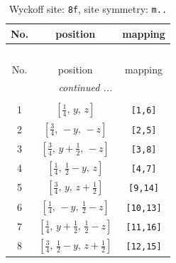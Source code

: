 \documentclass[fleqn,8pt]{jsarticle}
\begin{document}
\begin{longtable}{ccc}
\caption{Wyckoff site: {\tt 8f}, site symmetry: {\tt m..}}
 \\
 \hline \hline
No. & position & mapping \\ \hline \endfirsthead

\multicolumn{2}{l}{\tablename\ \thetable{}} \\
 \hline \hline
No. & position & mapping \\ \hline \endhead

 \hline \hline
\multicolumn{2}{r}{\footnotesize\it continued ...} \\ \endfoot

 \hline \hline
\multicolumn{2}{r}{} \\ \endlastfoot

1 & $\left[ \frac{1}{4},\, y,\, z \right]$ & {\tt [1,6]} \\ \hline
2 & $\left[ \frac{3}{4},\, - y,\, - z \right]$ & {\tt [2,5]} \\ \hline
3 & $\left[ \frac{3}{4},\, y + \frac{1}{2},\, - z \right]$ & {\tt [3,8]} \\ \hline
4 & $\left[ \frac{1}{4},\, \frac{1}{2} - y,\, z \right]$ & {\tt [4,7]} \\ \hline
5 & $\left[ \frac{3}{4},\, y,\, z + \frac{1}{2} \right]$ & {\tt [9,14]} \\ \hline
6 & $\left[ \frac{1}{4},\, - y,\, \frac{1}{2} - z \right]$ & {\tt [10,13]} \\ \hline
7 & $\left[ \frac{1}{4},\, y + \frac{1}{2},\, \frac{1}{2} - z \right]$ & {\tt [11,16]} \\ \hline
8 & $\left[ \frac{3}{4},\, \frac{1}{2} - y,\, z + \frac{1}{2} \right]$ & {\tt [12,15]} \\
\end{longtable}
\renewcommand{\arraystretch}{1.2}
\end{document}
